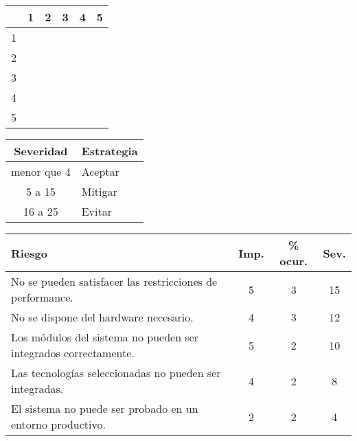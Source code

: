 \begin{center}
\vspace{15px}
\begin{tabular}{|c||c|c|c|c|c|}
	\hline
	& 1 & 2 & 3 & 4 & 5 \\ \hline
	\hline
	1 & \cellcolor[gray]{0.8} & \cellcolor[gray]{0.8} & \cellcolor[gray]{0.8} & \cellcolor[gray]{0.8} & \cellcolor[gray]{0.6} \\ \hline
	2 & \cellcolor[gray]{0.8} & \cellcolor[gray]{0.8} & \cellcolor[gray]{0.6} & \cellcolor[gray]{0.6} & \cellcolor[gray]{0.6} \\ \hline
	3 & \cellcolor[gray]{0.8} & \cellcolor[gray]{0.6} & \cellcolor[gray]{0.6} & \cellcolor[gray]{0.6} & \cellcolor[gray]{0.4} \\ \hline
	4 & \cellcolor[gray]{0.8} & \cellcolor[gray]{0.6} & \cellcolor[gray]{0.6} & \cellcolor[gray]{0.4} & \cellcolor[gray]{0.4} \\ \hline
	5 & \cellcolor[gray]{0.6} & \cellcolor[gray]{0.6} & \cellcolor[gray]{0.4} & \cellcolor[gray]{0.4} & \cellcolor[gray]{0.4} \\ \hline
\end{tabular}

\vspace{15px}

\begin{tabular}{|c|l|}
	\hline Severidad & Estrategia \\ \hline
	menor que 4 & Aceptar \\ \hline
	5 a 15 & Mitigar \\ \hline
	16 a 25 & Evitar \\ \hline
\end{tabular}

\vspace{15px}

\begin{tabular}{|l||c|c|c|}
	\hline
	Riesgo & Imp. & \% ocur. & Sev. \\
	\hline
	No se pueden satisfacer las restricciones de performance.  & 5 & 3 & 15 \\
	No se dispone del hardware necesario. & 4 & 3 & 12 \\
	Los módulos del sistema no pueden ser integrados correctamente. & 5 & 2 & 10 \\
	Las tecnologías seleccionadas no pueden ser integradas. & 4 & 2 & 8 \\
	El sistema no puede ser probado en un entorno productivo. & 2 & 2 & 4 \\
	\hline
\end{tabular}

\end{center}

